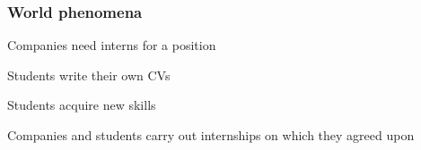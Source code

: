     \newpage
    \subsubsection{World phenomena}
        \begin{enumerate}[label={[WP\arabic*]}]
            \item {Companies need interns for a position}
            \item {Students write their own CVs}
            \item {Students acquire new skills }
            \item {Companies and students carry out internships on which they agreed upon}
        \end{enumerate}

    
